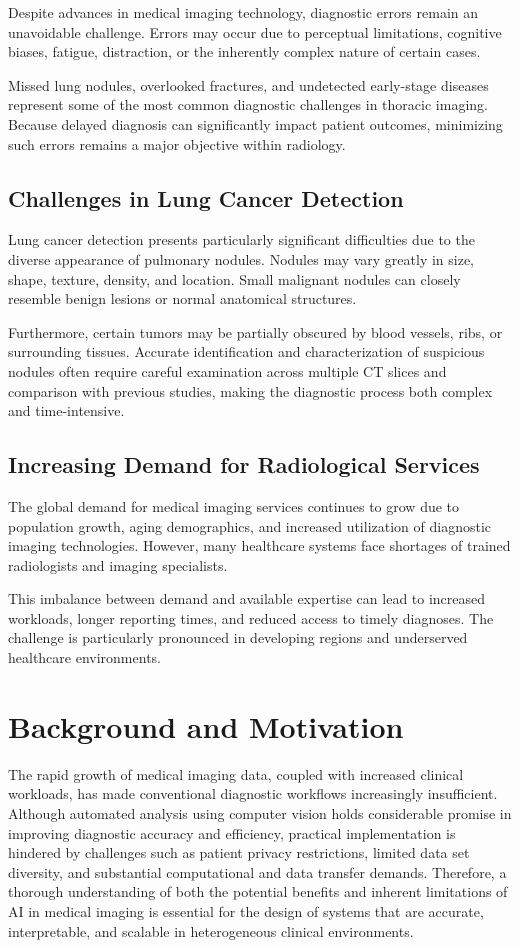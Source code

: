 Despite advances in medical imaging technology, diagnostic errors remain an unavoidable challenge. Errors may occur due to perceptual limitations, cognitive biases, fatigue, distraction, or the inherently complex nature of certain cases.

Missed lung nodules, overlooked fractures, and undetected early-stage diseases represent some of the most common diagnostic challenges in thoracic imaging. Because delayed diagnosis can significantly impact patient outcomes, minimizing such errors remains a major objective within radiology.

\subsection{Challenges in Lung Cancer Detection}

Lung cancer detection presents particularly significant difficulties due to the diverse appearance of pulmonary nodules. Nodules may vary greatly in size, shape, texture, density, and location. Small malignant nodules can closely resemble benign lesions or normal anatomical structures.

Furthermore, certain tumors may be partially obscured by blood vessels, ribs, or surrounding tissues. Accurate identification and characterization of suspicious nodules often require careful examination across multiple CT slices and comparison with previous studies, making the diagnostic process both complex and time-intensive.

\subsection{Increasing Demand for Radiological Services}

The global demand for medical imaging services continues to grow due to population growth, aging demographics, and increased utilization of diagnostic imaging technologies. However, many healthcare systems face shortages of trained radiologists and imaging specialists.

This imbalance between demand and available expertise can lead to increased workloads, longer reporting times, and reduced access to timely diagnoses. The challenge is particularly pronounced in developing regions and underserved healthcare environments.


\section{Background and Motivation}
The rapid growth of medical imaging data, coupled with increased clinical workloads, has made conventional diagnostic workflows increasingly insufficient. Although automated analysis using computer vision holds considerable promise in improving diagnostic accuracy and efficiency, practical implementation is hindered by challenges such as patient privacy restrictions, limited data set diversity, and substantial computational and data transfer demands. Therefore, a thorough understanding of both the potential benefits and inherent limitations of AI in medical imaging is essential for the design of systems that are accurate, interpretable, and scalable in heterogeneous clinical environments.
